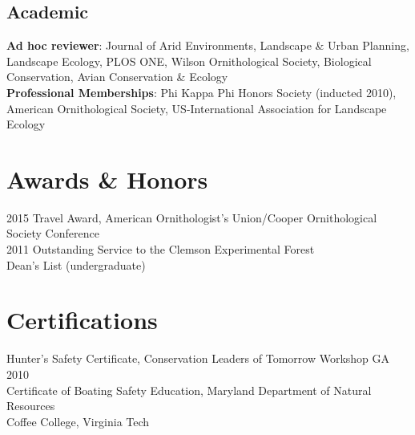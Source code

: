 \documentclass[11pt,a4paper,]{awesome-cv}
\begin{document}
\subsection{Academic}\label{academic}

\textbf{Ad hoc reviewer}: Journal of Arid Environments, Landscape \&
Urban Planning, Landscape Ecology, PLOS ONE, Wilson Ornithological
Society, Biological Conservation, Avian Conservation \& Ecology\\
\textbf{Professional Memberships}: Phi Kappa Phi Honors Society
(inducted 2010), American Ornithological Society, US-International
Association for Landscape Ecology

\section{Awards \& Honors}\label{awards-honors}

2015 Travel Award, American Ornithologist's Union/Cooper Ornithological
Society Conference\\
2011 Outstanding Service to the Clemson Experimental Forest\\
Dean's List (undergraduate)

\section{Certifications}\label{certifications}

Hunter's Safety Certificate, Conservation Leaders of Tomorrow Workshop
GA 2010\\
Certificate of Boating Safety Education, Maryland Department of Natural
Resources\\
Coffee College, Virginia Tech
\end{document}
